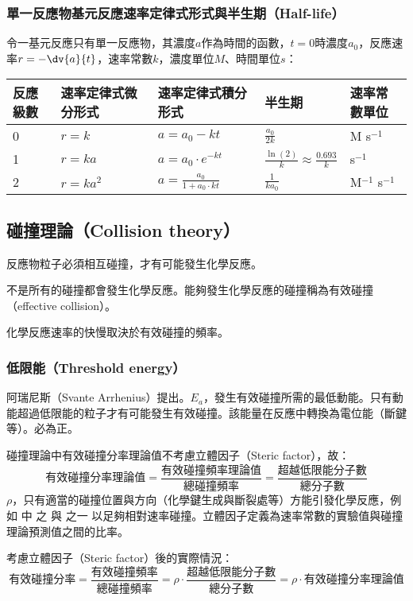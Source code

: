 \documentclass[a4paper,12pt]{article}
\begin{document}
\subsubsection{單一反應物基元反應速率定律式形式與半生期（Half-life）}
令一基元反應只有單一反應物，其濃度$a$作為時間的函數，$t=0$時濃度$a_0$，反應速率$r=-\dv{a}{t}$，速率常數$k$，濃度單位$M$、時間單位$s$：
\begin{longtable}[c]{|p{}|p{}|p{}|p{}|p{}|}
\hline
反應級數 & 速率定律式微分形式 & 速率定律式積分形式 & 半生期 & 速率常數單位 \\\hline
0 & $r=k$ & $a=a_0-kt$ & $\frac{a_0}{2k}$ & M s$^{-1}$ \\\hline
1 & $r=ka$ & $a=a_0\cdot e^{-kt}$ & $\frac{\ln(2)}{k}\approx\frac{0.693}{k}$ & s$^{-1}$ \\\hline
2 & $r=ka^2$ & $a=\frac{a_0}{1+a_0\cdot kt}$ & $\frac{1}{ka_0}$ & M$^{-1}$ s$^{-1}$ \\\hline
\end{longtable}\FloatBarrier
\subsection{碰撞理論（Collision theory）}
\ben
\item 反應物粒子必須相互碰撞，才有可能發生化學反應。
\item 不是所有的碰撞都會發生化學反應。能夠發生化學反應的碰撞稱為有效碰撞（effective collision）。
\item 化學反應速率的快慢取決於有效碰撞的頻率。
\een
\subsubsection{低限能（Threshold energy）}
阿瑞尼斯（Svante Arrhenius）提出。$E_a$，發生有效碰撞所需的最低動能。只有動能超過低限能的粒子才有可能發生有效碰撞。該能量在反應中轉換為電位能（斷鍵等）。必為正。

碰撞理論中有效碰撞分率理論值不考慮立體因子（Steric factor），故：
\[\text{有效碰撞分率理論值}=\frac{\text{有效碰撞頻率理論值}}{\text{總碰撞頻率}}=\frac{\text{超越低限能分子數}}{\text{總分子數}}\]
$\rho$，只有適當的碰撞位置與方向（化學鍵生成與斷裂處等）方能引發化學反應，例如  中  之  與  之一  以足夠相對速率碰撞。立體因子定義為速率常數的實驗值與碰撞理論預測值之間的比率。

考慮立體因子（Steric factor）後的實際情況：
\[\text{有效碰撞分率}=\frac{\text{有效碰撞頻率}}{\text{總碰撞頻率}}=\rho\cdot\frac{\text{超越低限能分子數}}{\text{總分子數}}=\rho\cdot\text{有效碰撞分率理論值}\]
\end{document}

